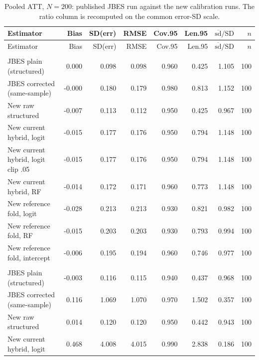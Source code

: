 {\footnotesize
\begin{longtable}{lrrrrrrr}
\caption{Pooled ATT, $N=200$: published JBES run against the new calibration runs. The ratio column is recomputed on the common error-SD scale.}\label{tab:repro_att}\\
\toprule
Estimator & Bias & SD(err) & RMSE & Cov.95 & Len.95 & $\overline{\mathrm{sd}}/\mathrm{SD}$ & $n$ \\
\midrule

\endfirsthead
\toprule
Estimator & Bias & SD(err) & RMSE & Cov.95 & Len.95 & $\overline{\mathrm{sd}}/\mathrm{SD}$ & $n$ \\
\midrule

\endhead
\bottomrule
\endlastfoot
\multicolumn{8}{l}{\textit{baseline, degree $d=1$}} \\
\quad JBES plain (structured) & 0.000 & 0.098 & 0.098 & 0.960 & 0.425 & 1.105 & 100 \\
\quad JBES corrected (same-sample) & -0.000 & 0.180 & 0.179 & 0.980 & 0.813 & 1.152 & 100 \\
\quad New raw structured & -0.007 & 0.113 & 0.112 & 0.950 & 0.425 & 0.967 & 100 \\
\quad New current hybrid, logit & -0.015 & 0.177 & 0.176 & 0.950 & 0.794 & 1.148 & 100 \\
\quad New current hybrid, logit clip .05 & -0.015 & 0.177 & 0.176 & 0.950 & 0.794 & 1.148 & 100 \\
\quad New current hybrid, RF & -0.014 & 0.172 & 0.171 & 0.960 & 0.773 & 1.148 & 100 \\
\quad New reference fold, logit & -0.028 & 0.213 & 0.213 & 0.930 & 0.821 & 0.982 & 100 \\
\quad New reference fold, RF & -0.015 & 0.203 & 0.203 & 0.930 & 0.793 & 0.994 & 100 \\
\quad New reference fold, intercept & -0.006 & 0.195 & 0.194 & 0.960 & 0.746 & 0.977 & 100 \\
\addlinespace
\multicolumn{8}{l}{\textit{baseline, degree $d=2$}} \\
\quad JBES plain (structured) & -0.003 & 0.116 & 0.115 & 0.940 & 0.437 & 0.968 & 100 \\
\quad JBES corrected (same-sample) & 0.116 & 1.069 & 1.070 & 0.970 & 1.502 & 0.357 & 100 \\
\quad New raw structured & 0.014 & 0.120 & 0.120 & 0.950 & 0.442 & 0.943 & 100 \\
\quad New current hybrid, logit & 0.468 & 4.008 & 4.015 & 0.990 & 2.838 & 0.186 & 100 \\

\end{longtable}}

